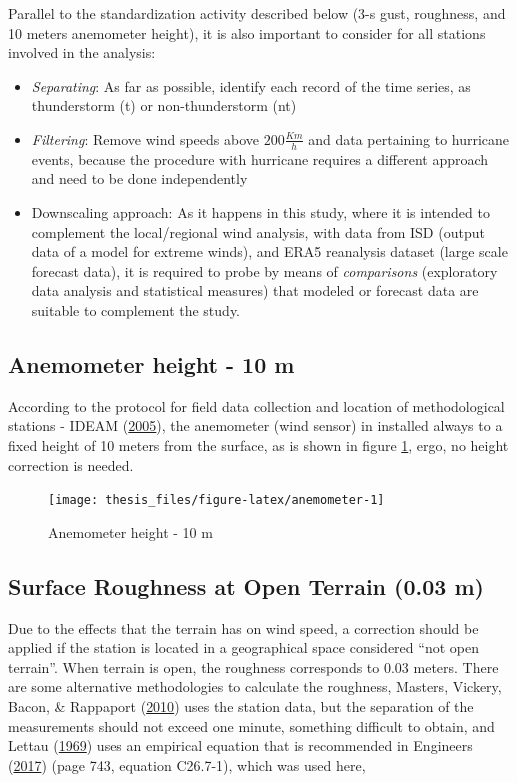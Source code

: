 \documentclass[12pt,oneside]{reedthesis}
\begin{document}
Parallel to the standardization activity described below (3-s gust, roughness, and 10 meters anemometer height), it is also important to consider for all stations involved in the analysis:
\begin{itemize}
\item
  \emph{Separating}: As far as possible, identify each record of the time series, as thunderstorm (t) or non-thunderstorm (nt)
\item
  \emph{Filtering}: Remove wind speeds above \(200 \frac{Km}{h}\) and data pertaining to hurricane events, because the procedure with hurricane requires a different approach and need to be done independently
\item
  Downscaling approach: As it happens in this study, where it is intended to complement the local/regional wind analysis, with data from ISD (output data of a model for extreme winds), and ERA5 reanalysis dataset (large scale forecast data), it is required to probe by means of \emph{comparisons} (exploratory data analysis and statistical measures) that modeled or forecast data are suitable to complement the study.
\end{itemize}
\hypertarget{anemometer-height---10-m}{%
\subsection{Anemometer height - 10 m}\label{anemometer-height---10-m}}

According to the protocol for field data collection and location of methodological stations - IDEAM (\protect\hyperlink{ref-ideam2005}{2005}), the anemometer (wind sensor) in installed always to a fixed height of 10 meters from the surface, as is shown in figure \ref{fig:anemometer}, ergo, no height correction is needed.
\begin{figure}

{\centering \texttt{[image: thesis\_files/figure-latex/anemometer-1]} 

}

\caption{Anemometer height - 10 m}\label{fig:anemometer}
\end{figure}
\hypertarget{rmd-roughness}{%
\subsection{Surface Roughness at Open Terrain (0.03 m)}\label{rmd-roughness}}

Due to the effects that the terrain has on wind speed, a correction should be applied if the station is located in a geographical space considered ``not open terrain''. When terrain is open, the roughness corresponds to 0.03 meters. There are some alternative methodologies to calculate the roughness, Masters, Vickery, Bacon, \& Rappaport (\protect\hyperlink{ref-Masters2010}{2010}) uses the station data, but the separation of the measurements should not exceed one minute, something difficult to obtain, and Lettau (\protect\hyperlink{ref-Lettau1969}{1969}) uses an empirical equation that is recommended in Engineers (\protect\hyperlink{ref-Asce2017}{2017}) (page 743, equation C26.7-1), which was used here,
\end{document}
